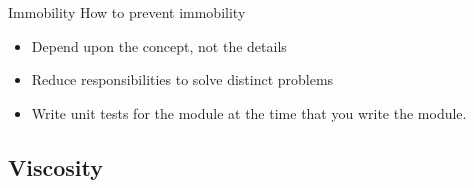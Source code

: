 \documentclass[xcolor=svgnames]{beamer}
\begin{document}

{%
%
\begin{frame}{\subsecname}
    \begin{minipage}{\columnwidth}
    \end{minipage}
\end{frame}
}


{%
%
\begin{frame}{Immobility}
    How to prevent immobility
    \begin{itemize}
        \item<1-> Depend upon the concept, not the details
        \item<2-> Reduce responsibilities to solve distinct problems
        \item<3-> Write unit tests for the module at the time that you write
                  the module.
    \end{itemize}
\end{frame}
}






\subsection{Viscosity}
\renewcommand{\background}{chaos}
\end{document}
